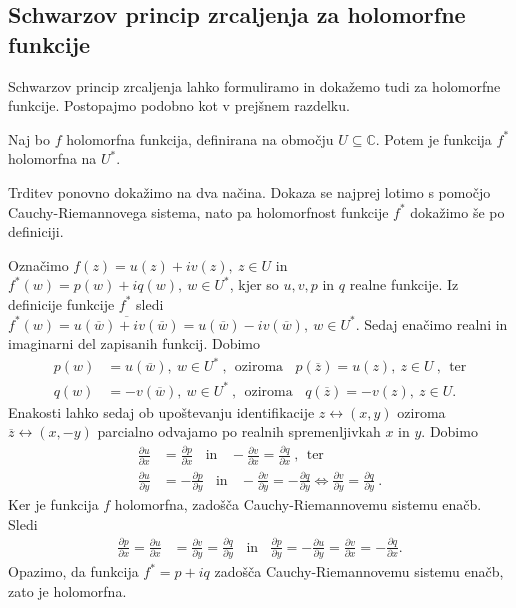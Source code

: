 \documentclass[mat1, tisk]{fmfdelo}
\begin{document}
\subsection{Schwarzov princip zrcaljenja za holomorfne funkcije}

    Schwarzov princip zrcaljenja lahko formuliramo in dokažemo tudi za holomorfne funkcije. 
    Postopajmo podobno kot v prejšnem razdelku.

    \begin{lema}
        \label{lemahol}
        Naj bo $f$ holomorfna funkcija, definirana na območju $U \subseteq \mathbb{C}$.
        Potem je funkcija $f^*$ holomorfna na $U^*$.
    \end{lema}
    \begin{dokaz}
        Trditev ponovno dokažimo na dva načina. Dokaza se najprej lotimo s pomočjo Cauchy-Riemannovega sistema, nato pa holomorfnost funkcije $f^*$ dokažimo še po definiciji.

        Označimo $f(z) = u(z) + iv(z),~ z \in U$ in $f^*(w) = p(w) + iq(w),~w \in U^*$, kjer so $u,v, p$ in $q$ realne funkcije. 
        Iz definicije funkcije $f^*$ sledi $f^*(w) = \overline{u(\overline{w}) + iv(\overline{w})} = u(\overline{w}) - iv(\overline{w}),~ w \in U^*$. 
        Sedaj enačimo realni in imaginarni del zapisanih funkcij. Dobimo
        \begin{align*}
            p(w) &= u(\overline{w}),~w \in U^*~,~~\text{oziroma}~~~~p(\overline{z}) = u(z),~z \in U~,~~\text{ter} \\
            q(w) &= -v(\overline{w}),~w \in U^*~,~~\text{oziroma}~~~~q(\overline{z}) = -v(z),~z \in U.
        \end{align*}
        Enakosti lahko sedaj ob upoštevanju identifikacije $z \leftrightarrow (x,y)$ oziroma $\overline{z} \leftrightarrow (x, -y)$ parcialno odvajamo po realnih spremenljivkah $x$ in $y$. Dobimo
        \begin{align*}
            \frac{\partial u}{\partial x} &= \frac{\partial p}{\partial x}~~~~\text{in}~~~~ -\frac{\partial v}{\partial x} = \frac{\partial q}{\partial x}~,~~\text{ter}\\
            \frac{\partial u}{\partial y} &=  - \frac{\partial p}{\partial y}~~~~\text{in}~~~~ -\frac{\partial v}{\partial y} = - \frac{\partial q}{\partial y} \iff \frac{\partial v}{\partial y} = \frac{\partial q}{\partial y}~.      
        \end{align*}
        Ker je funkcija $f$ holomorfna, zadošča Cauchy-Riemannovemu sistemu enačb.  
        Sledi
        \begin{align*}
            \frac{\partial p}{\partial x} = \frac{\partial u}{\partial x} &= \frac{\partial v}{\partial y} = \frac{\partial q}{\partial y}~~~~\text{in}~~~~ \frac{\partial p}{\partial y} = -\frac{\partial u}{\partial y} = \frac{\partial v}{\partial x} = -\frac{\partial q}{\partial x}.
        \end{align*}
        Opazimo, da funkcija $f^* = p + iq$ zadošča Cauchy-Riemannovemu sistemu enačb, zato je holomorfna.


\end{dokaz}
\end{document}
